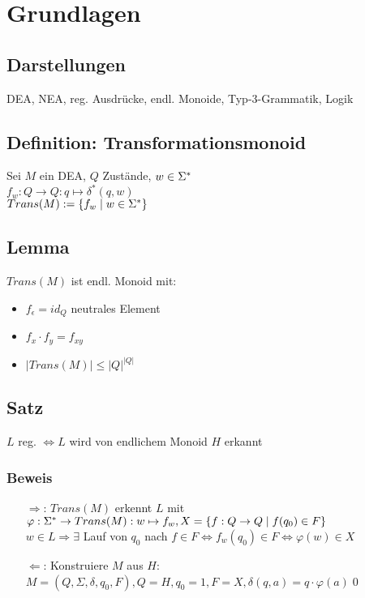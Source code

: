 \section{Grundlagen}
    \subsection{Darstellungen}
        DEA, NEA, reg. Ausdrücke, endl. Monoide, Typ-3-Grammatik, Logik
    \subsection{Definition: Transformationsmonoid}
        Sei $M$ ein DEA, $Q$ Zustände, $w\in\Sigma^*$\\
        $f_w:Q\rightarrow Q: q\mapsto \delta^*(q,w)$\\
        $Trans(M):=\{f_w\mid w\in\Sigma^*\}$
    \subsection{Lemma}
        $Trans(M)$ ist endl. Monoid mit:
        \begin{itemize}
            \item $f_\epsilon=id_Q$ neutrales Element
            \item $f_x\cdot f_y=f_{xy}$
            \item $|Trans(M)|\leq |Q|^{|Q|}$
        \end{itemize}
    \subsection{Satz}
        $L$ reg. $\Leftrightarrow L$ wird von endlichem Monoid $H$ erkannt
        \subsubsection{Beweis}
            \begin{itemize}
                \item[$\Rightarrow$:] $Trans(M)$ erkennt $L$ mit $\varphi:\Sigma^*\rightarrow Trans(M):w\mapsto f_w,\\ X=\{f:Q\rightarrow Q\mid f(q_0)\in F\}$\\
                $w\in L\Rightarrow\exists$ Lauf von $q_0$ nach $f\in F\Leftrightarrow f_w(q_0)\in F\Leftrightarrow\varphi(w)\in X$
                \item[$\Leftarrow$:] Konstruiere $M$ aus $H$:\\
                $M=(Q,\Sigma,\delta,q_0,F),Q=H,q_0=1,F=X,\delta(q,a)=q\cdot\varphi(a)$\qed
            \end{itemize}
